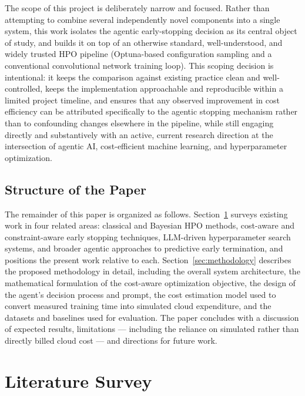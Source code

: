\documentclass[11pt]{article}
\begin{document}
The scope of this project is deliberately narrow and focused. Rather than attempting to combine several independently novel components into a single system, this work isolates the agentic early-stopping decision as its central object of study, and builds it on top of an otherwise standard, well-understood, and widely trusted HPO pipeline (Optuna-based configuration sampling and a conventional convolutional network training loop). This scoping decision is intentional: it keeps the comparison against existing practice clean and well-controlled, keeps the implementation approachable and reproducible within a limited project timeline, and ensures that any observed improvement in cost efficiency can be attributed specifically to the agentic stopping mechanism rather than to confounding changes elsewhere in the pipeline, while still engaging directly and substantively with an active, current research direction at the intersection of agentic AI, cost-efficient machine learning, and hyperparameter optimization.

\subsection{Structure of the Paper}

The remainder of this paper is organized as follows. Section~\ref{sec:litsurvey} surveys existing work in four related areas: classical and Bayesian HPO methods, cost-aware and constraint-aware early stopping techniques, LLM-driven hyperparameter search systems, and broader agentic approaches to predictive early termination, and positions the present work relative to each. Section~\ref{sec:methodology} describes the proposed methodology in detail, including the overall system architecture, the mathematical formulation of the cost-aware optimization objective, the design of the agent's decision process and prompt, the cost estimation model used to convert measured training time into simulated cloud expenditure, and the datasets and baselines used for evaluation. The paper concludes with a discussion of expected results, limitations --- including the reliance on simulated rather than directly billed cloud cost --- and directions for future work.

\section{Literature Survey}
\label{sec:litsurvey}
\end{document}
